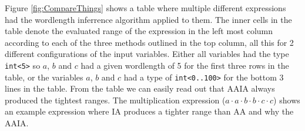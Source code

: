 Figure \ref{fig:CompareThings} shows a table where multiple different expressions had the wordlength inferrence algorithm applied to them. The inner cells in the table denote the evaluated range of the expression in the left most column according to each of the three methods outlined in the top column, all this for 2 different configurations of the input variables. Either all variables had the type \verb+int<5>+ so $a$, $b$ and $c$ had a given wordlength of 5 for the first three rows in the table, or the variables $a$, $b$ and $c$ had a type of \verb+int<0..100>+ for the bottom 3 lines in the table. From the table we can easily read out that AAIA always produced the tightest ranges. The multiplication expression ($a \cdot a \cdot b \cdot b \cdot c \cdot c$) shows an example expression where IA produces a tighter range than AA and why the AAIA.

